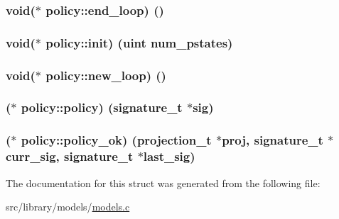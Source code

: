 \subsubsection[{\texorpdfstring{end\+\_\+loop}{end_loop}}]{\setlength{\rightskip}{0pt plus 5cm}void($\ast$ policy\+::end\+\_\+loop) ()}\hypertarget{structpolicy_a2e7ced29d27efca9a3d90ffc8fe0226e}{}\label{structpolicy_a2e7ced29d27efca9a3d90ffc8fe0226e}
\subsubsection[{\texorpdfstring{init}{init}}]{\setlength{\rightskip}{0pt plus 5cm}void($\ast$ policy\+::init) ({\bf uint} num\+\_\+pstates)}\hypertarget{structpolicy_ade5ad6f0239e34d13826497fd72d917e}{}\label{structpolicy_ade5ad6f0239e34d13826497fd72d917e}
\subsubsection[{\texorpdfstring{new\+\_\+loop}{new_loop}}]{\setlength{\rightskip}{0pt plus 5cm}void($\ast$ policy\+::new\+\_\+loop) ()}\hypertarget{structpolicy_a9bb8e49f1796876238623460ff349ebf}{}\label{structpolicy_a9bb8e49f1796876238623460ff349ebf}
\subsubsection[{\texorpdfstring{policy}{policy}}]{($\ast$ policy\+::policy) ({\bf signature\+\_\+t} $\ast$sig)}\hypertarget{structpolicy_a9c08472eff148dd22c31f1b733dfed60}{}\label{structpolicy_a9c08472eff148dd22c31f1b733dfed60}
\subsubsection[{\texorpdfstring{policy\+\_\+ok}{policy_ok}}]{($\ast$ policy\+::policy\+\_\+ok) ({\bf projection\+\_\+t} $\ast$proj, {\bf signature\+\_\+t} $\ast$curr\+\_\+sig, {\bf signature\+\_\+t} $\ast$last\+\_\+sig)}\hypertarget{structpolicy_a5be97c21f646a597063e280cbcaec128}{}\label{structpolicy_a5be97c21f646a597063e280cbcaec128}


The documentation for this struct was generated from the following file\+:\begin{DoxyCompactItemize}
\item 
src/library/models/\hyperlink{models_8c}{models.\+c}\end{DoxyCompactItemize}
